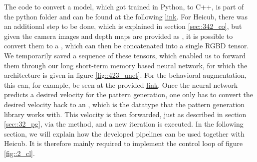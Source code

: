 The code to convert a model, which got trained in Python, to C++, is part of the python folder and can be found at the following \href{https://github.com/mhubii/nmpc_pattern_generator/blob/master/libs/learning/python/python_to_cpp.py}{\underline{link}}. For Heicub, there was an additional step to be done, which is explained in section \ref{sec::342_co}, but given the camera images and depth maps are provided as , it is possible to convert them to a , which can then be concatenated into a single RGBD tensor. We temporarily saved a sequence of these tensors, which enabled us to forward them through our long short-term memory based neural network, for which the architecture is given in figure \ref{fig::423_unet}. For the behavioral augmentation, this can, for example, be seen at the provided \href{https://github.com/mhubii/nmpc_pattern_generator/blob/719fde0bb73925923de85cbf379c5523e075dfeb/src/behavioural_augmentation_real_robot_external_data.cpp#L625}{\underline{link}}. Once the neural network predicts a desired velocity for the pattern generation, one only has to convert the desired velocity back to an , which is the datatype that the pattern generation library works with. This velocity is then forwarded, just as described in section \ref{sec::32_pg}, via the  method, and a new iteration is executed. In the following section, we will explain how the developed pipelines can be used together with Heicub. It is therefore mainly required to implement the control loop of figure \ref{fig::2_cl}. 